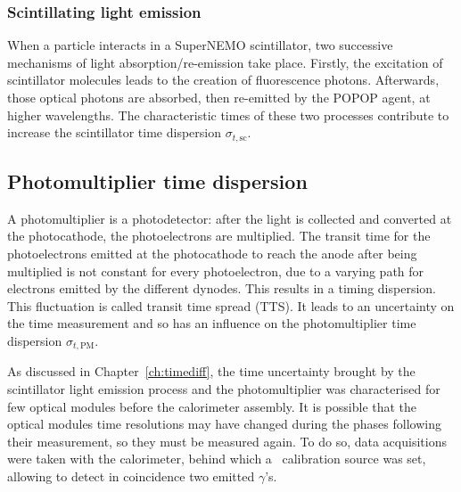 \subsubsection*{Scintillating light emission}
When a particle interacts in a SuperNEMO scintillator, two successive mechanisms of light absorption/re-emission take place.
Firstly, the excitation of scintillator molecules leads to the creation of fluorescence photons.
Afterwards, those optical photons are absorbed, then re-emitted by the POPOP agent, at higher wavelengths.
The characteristic times of these two processes contribute to increase the scintillator time dispersion $\sigma_{t,\text{sc}}$.

\subsection{Photomultiplier time dispersion}

A photomultiplier is a photodetector: after the light is collected and converted at the photocathode, the photoelectrons are multiplied.
The transit time for the photoelectrons emitted at the photocathode to reach the anode after being multiplied is not constant for every photoelectron, due to a varying path for electrons emitted by the different dynodes.
This results in a timing dispersion.
This fluctuation is called transit time spread (TTS).
It leads to an uncertainty on the time measurement and so has an influence on the photomultiplier time dispersion $\sigma_{t,\text{PM}}$.

As discussed in Chapter~\ref{ch:timediff}, the time uncertainty brought by the scintillator light emission process and the photomultiplier was characterised for few optical modules before the calorimeter assembly.
It is possible that the optical modules time resolutions may have changed during the phases following their measurement, so they must be measured again.
To do so, data acquisitions were taken with the calorimeter, behind which a \Co\ calibration source was set, allowing to detect in coincidence two emitted $\gamma$'s.


